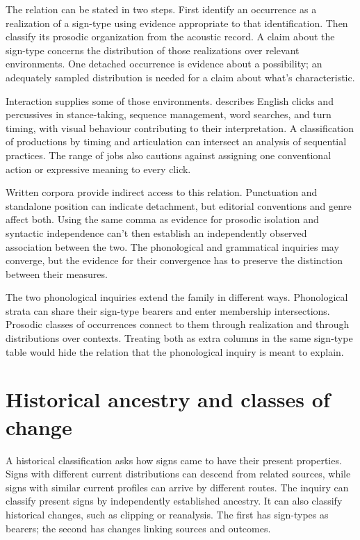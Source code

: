 \documentclass[12pt]{article}
\begin{document}
The relation can be stated in two steps. First identify an occurrence
as a realization of a sign-type using evidence appropriate to that
identification. Then classify its prosodic organization from the acoustic
record. A claim about the sign-type concerns the distribution of those
realizations over relevant environments. One detached occurrence is
evidence about a possibility; an adequately sampled distribution is needed
for a claim about what's characteristic.

Interaction supplies some of those environments. \textcite{ogden2013clicks} describes English
clicks and percussives in stance-taking, sequence management, word searches,
and turn timing, with visual behaviour contributing to their interpretation. A classification of productions by timing and
articulation can intersect an analysis of sequential practices.
The range of jobs also cautions against assigning one conventional action
or expressive meaning to every click.

Written corpora provide indirect access to this relation. Punctuation
and standalone position can indicate detachment, but editorial conventions
and genre affect both. Using the same comma as evidence for prosodic
isolation and syntactic independence can't then establish an independently
observed association between the two. The phonological and grammatical
inquiries may converge, but the evidence for their convergence has to
preserve the distinction between their measures.

The two phonological inquiries extend the family in different ways. Phonological strata can share their sign-type bearers and
enter membership intersections. Prosodic classes of occurrences connect
to them through realization and through distributions over contexts.
Treating both as extra columns in the same sign-type table would hide
the relation that the phonological inquiry is meant to explain.

\section{Historical ancestry and classes of change}\label{sec:history}

A historical classification asks how signs came to have their present
properties. Signs with different current distributions can descend from
related sources, while signs with similar current profiles can arrive by
different routes. The inquiry can classify present signs by independently
established ancestry. It can also classify historical changes, such as
clipping or reanalysis. The first has sign-types as bearers; the second
has changes linking sources and outcomes.
\end{document}
